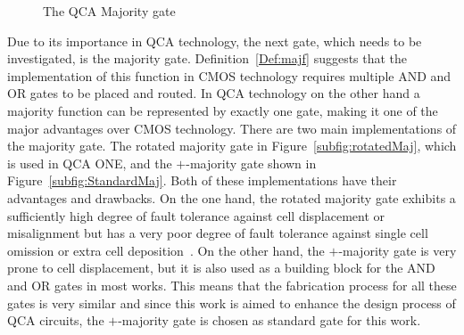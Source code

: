 \begin{figure}
{
		\label{subfig:StandardOr}
	}
	\caption{The QCA Majority gate} \label{fig:QCAMaj}
\end{figure}

Due to its importance in QCA technology, the next gate, which needs to be investigated, is the majority gate. Definition~\ref{Def:majf} suggests that the implementation of this function in CMOS technology requires multiple AND and OR gates to be placed and routed. In QCA technology on the other hand a majority function can be represented by exactly one gate, making it one of the major advantages over CMOS technology. There are two main implementations of the majority gate. The rotated majority gate in Figure~\ref{subfig:rotatedMaj}, which is used in QCA ONE, and the $+$-majority gate shown in Figure~\ref{subfig:StandardMaj}. Both of these implementations have their advantages and drawbacks. On the one hand, the rotated majority gate exhibits a sufficiently high degree of fault tolerance against cell displacement or misalignment but has a very poor degree of fault tolerance against single cell omission or extra cell deposition~\cite{majorityrotated}. On the other hand, the $+$-majority gate is very prone to cell displacement, but it is also used as a building block for the AND and OR gates in most works. This means that the fabrication process for all these gates is very similar and since this work is aimed to enhance the design process of QCA circuits, the $+$-majority gate is chosen as standard gate for this work.

